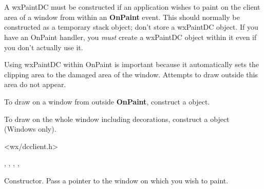 \section{}\label{wxpaintdc}

A wxPaintDC must be constructed if an application wishes to paint on the
client area of a window from within an {\bf OnPaint} event.
This should normally be constructed as a temporary stack object; don't store
a wxPaintDC object. If you have an OnPaint handler, you {\it must} create a wxPaintDC
object within it even if you don't actually use it.

Using wxPaintDC within OnPaint is important because it automatically
sets the clipping area to the damaged area of the window. Attempts to draw
outside this area do not appear.

To draw on a window from outside {\bf OnPaint}, construct a  object.

To draw on the whole window including decorations, construct a  object
(Windows only).




<wx/dcclient.h>


, , ,\rtfsp
{}, 




Constructor. Pass a pointer to the window on which you wish to paint.



